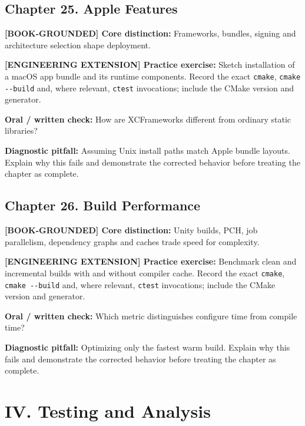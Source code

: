 \documentclass[11pt,letterpaper,oneside]{report}
\providecommand{\passthrough}[1]{#1}
\begin{document}
\section{Chapter 25. Apple Features}\label{chapter-25.-apple-features}

\textbf{{[}BOOK-GROUNDED{]} Core distinction:} Frameworks, bundles,
signing and architecture selection shape deployment.

\textbf{{[}ENGINEERING EXTENSION{]} Practice exercise:} Sketch
installation of a macOS app bundle and its runtime components. Record
the exact \passthrough{\lstinline!cmake!},
\passthrough{\lstinline!cmake --build!} and, where relevant,
\passthrough{\lstinline!ctest!} invocations; include the CMake version
and generator.

\textbf{Oral / written check:} How are XCFrameworks different from
ordinary static libraries?

\textbf{Diagnostic pitfall:} Assuming Unix install paths match Apple
bundle layouts. Explain why this fails and demonstrate the corrected
behavior before treating the chapter as complete.

\section{Chapter 26. Build
Performance}\label{chapter-26.-build-performance}

\textbf{{[}BOOK-GROUNDED{]} Core distinction:} Unity builds, PCH, job
parallelism, dependency graphs and caches trade speed for complexity.

\textbf{{[}ENGINEERING EXTENSION{]} Practice exercise:} Benchmark clean
and incremental builds with and without compiler cache. Record the exact
\passthrough{\lstinline!cmake!}, \passthrough{\lstinline!cmake --build!}
and, where relevant, \passthrough{\lstinline!ctest!} invocations;
include the CMake version and generator.

\textbf{Oral / written check:} Which metric distinguishes configure time
from compile time?

\textbf{Diagnostic pitfall:} Optimizing only the fastest warm build.
Explain why this fails and demonstrate the corrected behavior before
treating the chapter as complete.

\chapter{IV. Testing and Analysis}\label{iv.-testing-and-analysis}
\end{document}
